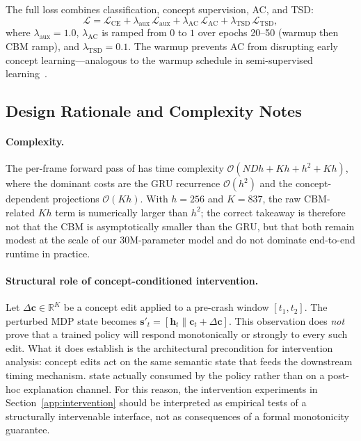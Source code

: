 The full loss combines classification, concept supervision, AC, and TSD:
\begin{equation}
  \mathcal{L}
  = \mathcal{L}_{\text{CE}}
  + \lambda_{\text{aux}}\,\mathcal{L}_{\text{aux}}
  + \lambda_{\text{AC}}\,\mathcal{L}_{\text{AC}}
  + \lambda_{\text{TSD}}\,\mathcal{L}_{\text{TSD}},
  \label{eq:total_loss}
\end{equation}
where $\lambda_{\text{aux}}{=}1.0$, $\lambda_{\text{AC}}$ is ramped
from $0$ to $1$ over epochs 20--50 (warmup then CBM ramp), and
$\lambda_{\text{TSD}}{=}0.1$. The warmup prevents AC from disrupting
early concept learning---analogous to the warmup schedule in
semi-supervised learning~\citep{fang2022traffic}.

\subsection{Design Rationale and Complexity Notes}
\label{sec:theory}

\paragraph{Complexity.}
The per-frame forward pass of \method{} has time complexity
$\mathcal{O}(NDh + Kh + h^2 + Kh)$, where the dominant costs are the
GRU recurrence $\mathcal{O}(h^2)$ and the concept-dependent projections
$\mathcal{O}(Kh)$. With $h{=}256$ and $K{=}837$, the raw CBM-related
$Kh$ term is numerically larger than $h^2$; the correct takeaway is therefore
not that the CBM is asymptotically smaller than the GRU, but that both remain
modest at the scale of our 30M-parameter model and do not dominate end-to-end
runtime in practice.

\paragraph{Structural role of concept-conditioned intervention.}
Let $\Delta\mathbf{c}\in\mathbb{R}^K$ be a concept edit applied to a
pre-crash window $[t_1, t_2]$. The perturbed MDP state becomes
$\mathbf{s}'_t = [\mathbf{h}_t\|\mathbf{c}_t + \Delta\mathbf{c}]$.
This observation does \emph{not} prove that a trained policy will respond
monotonically or strongly to every such edit. What it does establish is the
architectural precondition for intervention analysis: concept edits act on the
same semantic state that feeds the downstream timing mechanism.
state actually consumed by the policy rather than on a post-hoc explanation
channel. For this reason, the intervention experiments in
Section~\ref{app:intervention} should be interpreted as empirical tests of a
structurally intervenable interface, not as consequences of a formal monotonicity
guarantee.
